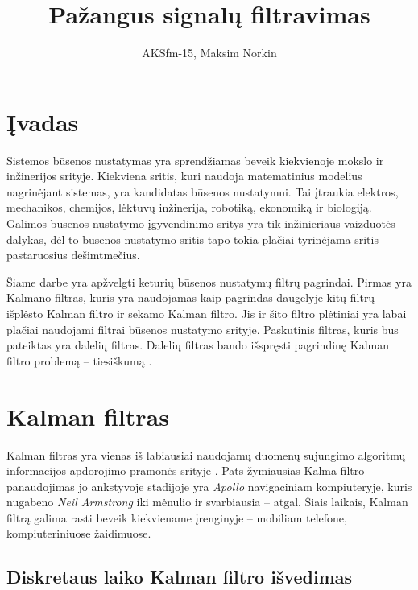 \documentclass[12pt, a4paper, lithuanian]{article}
\author{AKSfm-15, Maksim Norkin}
\title{Pažangus signalų filtravimas}
\date{}
\begin{document}
    \maketitle

    \newpage

    \tableofcontents

    \newpage

    \section{Įvadas}

        Sistemos būsenos nustatymas yra sprendžiamas beveik kiekvienoje mokslo ir inžinerijos srityje.
        Kiekviena sritis, kuri naudoja matematinius modelius nagrinėjant sistemas, yra kandidatas būsenos nustatymui.
        Tai įtraukia elektros, mechanikos, chemijos, lėktuvų inžinerija, robotiką, ekonomiką ir biologiją.
        Galimos būsenos nustatymo įgyvendinimo sritys yra tik inžinieriaus vaizduotės dalykas, dėl to būsenos nustatymo sritis tapo tokia plačiai tyrinėjama sritis pastaruosius dešimtmečius.

        Šiame darbe yra apžvelgti keturių būsenos nustatymų filtrų pagrindai.
        Pirmas yra Kalmano filtras, kuris yra naudojamas kaip pagrindas daugelyje kitų filtrų -- išplėsto Kalman filtro ir sekamo Kalman filtro.
        Jis ir šito filtro plėtiniai yra labai plačiai naudojami filtrai būsenos nustatymo srityje.
        Paskutinis filtras, kuris bus pateiktas yra dalelių filtras.
        Dalelių filtras bando išspręsti pagrindinę Kalman filtro problemą -- tiesiškumą \cite{simon2006optimal}.

    \section{Kalman filtras}
        Kalman filtras \cite{kalman1960new} yra vienas iš labiausiai naudojamų duomenų sujungimo algoritmų informacijos apdorojimo pramonės srityje \cite{faragher2012understanding}. Pats žymiausias Kalma filtro panaudojimas jo ankstyvoje stadijoje yra \textit{Apollo} navigaciniam kompiuteryje, kuris nugabeno \textit{Neil Armstrong} iki mėnulio ir svarbiausia -- atgal. Šiais laikais, Kalman filtrą galima rasti beveik kiekviename įrenginyje -- mobiliam telefone, kompiuteriniuose žaidimuose.

        \subsection{Diskretaus laiko Kalman filtro išvedimas}
\end{document}
